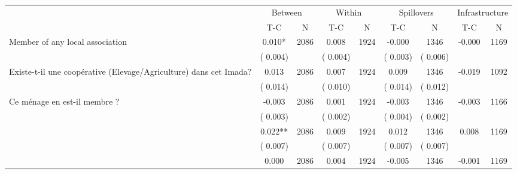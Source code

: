 
\begin{tabular}{l*{8}{c}}\hline&\multicolumn{2}{c}{Between}&\multicolumn{2}{c}{Within}&\multicolumn{2}{c}{Spillovers}&\multicolumn{2}{c}{Infrastructure}\\ \cmidrule(r){2-3}\cmidrule(l){4-5}\cmidrule(l){6-7}\cmidrule(l){8-9} & {T-C} & {N} & {T-C} & {N}  & {T-C}  & {N} & {T-C}  & {N} \\ \midrule
Member of any local association        &              0.010*      &       2086       &              0.008      &       1924       &             -0.000      &       1346  &       -0.000 &       1169       \\
                       &       (       0.004)            &                               &       (       0.004)            &                               &       (       0.003)            &       (       0.006) &                  \\
Existe-t-il une coopérative (Elevage/Agriculture) dans cet Imada?        &              0.013      &       2086       &              0.007      &       1924       &              0.009      &       1346  &       -0.019 &       1092       \\
                       &       (       0.014)            &                               &       (       0.010)            &                               &       (       0.014)            &       (       0.012) &                  \\
Ce ménage en est-il membre ?        &             -0.003      &       2086       &              0.001      &       1924       &             -0.003      &       1346  &       -0.003 &       1166       \\
                       &       (       0.003)            &                               &       (       0.002)            &                               &       (       0.004)            &       (       0.002) &                  \\
        &              0.022**      &       2086       &              0.009      &       1924       &              0.012      &       1346  &        0.008 &       1169       \\
                       &       (       0.007)            &                               &       (       0.007)            &                               &       (       0.007)            &       (       0.007) &                  \\
        &              0.000      &       2086       &              0.004      &       1924       &             -0.005      &       1346  &       -0.001 &       1169       \\

\end{tabular}
